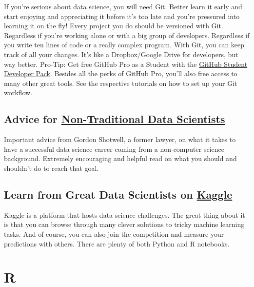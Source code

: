 \documentclass[
  11pt,
]{book}
\begin{document}
If you're serious about data science, you will need Git. Better learn it early and start enjoying and appreciating it before it's too late and you're pressured into learning it on the fly! Every project you do should be versioned with Git. Regardless if you're working alone or with a big group of developers. Regardless if you write ten lines of code or a really complex program. With Git, you can keep track of all your changes. It's like a Dropbox/Google Drive for developers, but way better. Pro-Tip: Get free GitHub Pro as a Student with the \href{https://education.github.com/pack}{GitHub Student Developer Pack}. Besides all the perks of GitHub Pro, you'll also free access to many other great tools. See the respective tutorials on how to set up your Git workflow.

\hypertarget{advice-for-non-traditional-data-scientists}{%
\subsection*{\texorpdfstring{Advice for \href{https://blog.shotwell.ca/posts/learning_data_science/}{Non-Traditional Data Scientists}}{Advice for Non-Traditional Data Scientists}}\label{advice-for-non-traditional-data-scientists}}

Important advice from Gordon Shotwell, a former lawyer, on what it takes to have a successful data science career coming from a non-computer science background. Extremely encouraging and helpful read on what you should and shouldn't do to reach that goal.

\hypertarget{learn-from-great-data-scientists-on-kaggle}{%
\subsection*{\texorpdfstring{Learn from Great Data Scientists on \href{https://www.kaggle.com/}{Kaggle}}{Learn from Great Data Scientists on Kaggle}}\label{learn-from-great-data-scientists-on-kaggle}}

Kaggle is a platform that hosts data science challenges. The great thing about it is that you can browse through many clever solutions to tricky machine learning tasks. And of course, you can also join the competition and measure your predictions with others. There are plenty of both Python and R notebooks.

\hypertarget{r}{%
\section{R}\label{r}}
\end{document}
